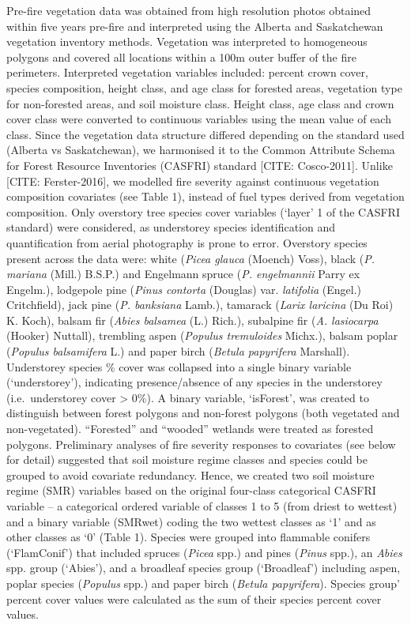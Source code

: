 \documentclass[
  numafflabel,
  authoryear,
  preprint]{elsarticle}
\begin{document}
Pre-fire vegetation data was obtained from high resolution photos
obtained within five years pre-fire and interpreted using the Alberta
and Saskatchewan vegetation inventory methods. Vegetation was
interpreted to homogeneous polygons and covered all locations within a
100m outer buffer of the fire perimeters. Interpreted vegetation
variables included: percent crown cover, species composition, height
class, and age class for forested areas, vegetation type for
non-forested areas, and soil moisture class. Height class, age class and
crown cover class were converted to continuous variables using the mean
value of each class. Since the vegetation data structure differed
depending on the standard used (Alberta vs Saskatchewan), we harmonised
it to the Common Attribute Schema for Forest Resource Inventories
(CASFRI) standard {[}CITE: Cosco-2011{]}. Unlike {[}CITE:
Ferster-2016{]}, we modelled fire severity against continuous vegetation
composition covariates (see Table 1), instead of fuel types derived from
vegetation composition. Only overstory tree species cover variables
(`layer' 1 of the CASFRI standard) were considered, as understorey
species identification and quantification from aerial photography is
prone to error. Overstory species present across the data were: white
(\emph{Picea glauca} (Moench) Voss), black (\emph{P. mariana} (Mill.)
B.S.P.) and Engelmann spruce (\emph{P. engelmannii} Parry ex Engelm.),
lodgepole pine (\emph{Pinus contorta} (Douglas) var. \emph{latifolia}
(Engel.) Critchfield), jack pine (\emph{P. banksiana} Lamb.), tamarack
(\emph{Larix laricina} (Du Roi) K. Koch), balsam fir (\emph{Abies
balsamea} (L.) Rich.), subalpine fir (\emph{A. lasiocarpa} (Hooker)
Nuttall), trembling aspen (\emph{Populus tremuloides} Michx.), balsam
poplar (\emph{Populus balsamifera} L.) and paper birch (\emph{Betula
papyrifera} Marshall). Understorey species \% cover was collapsed into a
single binary variable (`understorey'), indicating presence/absence of
any species in the understorey (i.e.~understorey cover \textgreater{}
0\%). A binary variable, `isForest', was created to distinguish between
forest polygons and non-forest polygons (both vegetated and
non-vegetated). ``Forested'' and ``wooded'' wetlands were treated as
forested polygons. Preliminary analyses of fire severity responses to
covariates (see below for detail) suggested that soil moisture regime
classes and species could be grouped to avoid covariate redundancy.
Hence, we created two soil moisture regime (SMR) variables based on the
original four-class categorical CASFRI variable -- a categorical ordered
variable of classes 1 to 5 (from driest to wettest) and a binary
variable (SMRwet) coding the two wettest classes as `1' and as other
classes as `0' (Table 1). Species were grouped into flammable conifers
(`FlamConif') that included spruces (\emph{Picea} spp.) and pines
(\emph{Pinus} spp.), an \emph{Abies} spp. group (`Abies'), and a
broadleaf species group (`Broadleaf') including aspen, poplar species
(\emph{Populus} spp.) and paper birch (\emph{Betula papyrifera}).
Species group' percent cover values were calculated as the sum of their
species percent cover values.
\end{document}
